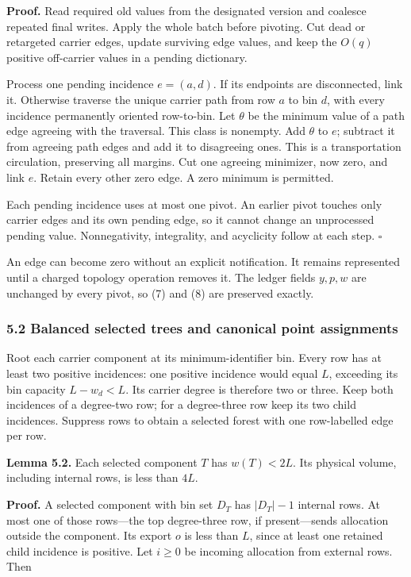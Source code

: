 \textbf{Proof.} Read required old values from the designated version and coalesce repeated final writes. Apply the whole batch before pivoting. Cut dead or retargeted carrier edges, update surviving edge values, and keep the \(O(q)\) positive off-carrier values in a pending dictionary.

Process one pending incidence \(e=(a,d)\). If its endpoints are disconnected, link it. Otherwise traverse the unique carrier path from row \(a\) to bin \(d\), with every incidence permanently oriented row-to-bin. Let \(\theta\) be the minimum value of a path edge agreeing with the traversal. This class is nonempty. Add \(\theta\) to \(e\); subtract it from agreeing path edges and add it to disagreeing ones. This is a transportation circulation, preserving all margins. Cut one agreeing minimizer, now zero, and link \(e\). Retain every other zero edge. A zero minimum is permitted.

Each pending incidence uses at most one pivot. An earlier pivot touches only carrier edges and its own pending edge, so it cannot change an unprocessed pending value. Nonnegativity, integrality, and acyclicity follow at each step. \hfill\(\square\)

An edge can become zero without an explicit notification. It remains represented until a charged topology operation removes it. The ledger fields \(y,p,w\) are unchanged by every pivot, so (7) and (8) are preserved exactly.

\hypertarget{af-46593eb93e-balanced-selected-trees-and-canonical-point-assignments}{%
\subsubsection{5.2 Balanced selected trees and canonical point assignments}\label{af-46593eb93e-balanced-selected-trees-and-canonical-point-assignments}}

Root each carrier component at its minimum-identifier bin. Every row has at least two positive incidences: one positive incidence would equal \(L\), exceeding its bin capacity \(L-w_d<L\). Its carrier degree is therefore two or three. Keep both incidences of a degree-two row; for a degree-three row keep its two child incidences. Suppress rows to obtain a selected forest with one row-labelled edge per row.

\textbf{Lemma 5.2.} Each selected component \(T\) has \(w(T)<2L\). Its physical volume, including internal rows, is less than \(4L\).

\textbf{Proof.} A selected component with bin set \(D_T\) has \(|D_T|-1\) internal rows. At most one of those rows---the top degree-three row, if present---sends allocation outside the component. Its export \(o\) is less than \(L\), since at least one retained child incidence is positive. Let \(i\geq0\) be incoming allocation from external rows. Then

